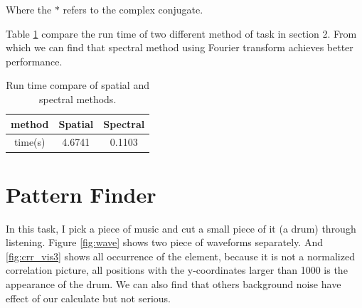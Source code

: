 Where the $*$ refers to the complex conjugate.

Table \ref{tab:run_time} compare the run time of two different method of task in section 2. From which we can find that spectral method using Fourier transform achieves better performance.

\begin{table}[h!]
	\centering
	\begin{tabular}{c|c|c}
		\hline
		method & Spatial  & Spectral \\
		\hline
		time(s) & 4.6741 & 0.1103 \\
		\hline
	\end{tabular}
	\caption{Run time compare of spatial and spectral methods.}
	\label{tab:run_time}
\end{table}

\section{Pattern Finder}

In this task, I pick a piece of music and cut a small piece of it (a drum) through listening. Figure \ref{fig:wave} shows two piece of  waveforms separately. And 
\ref{fig:crr_vis3} shows all occurrence of the element, because it is not a normalized correlation picture, all positions with the y-coordinates larger than 1000 is the appearance of the drum. We can also find that others background noise have effect of our calculate but not serious.

